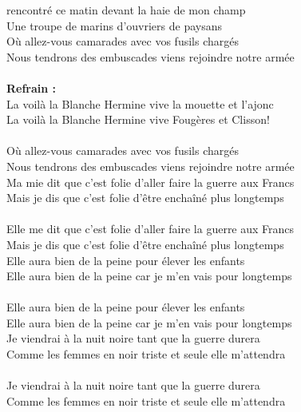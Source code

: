
 rencontré ce matin devant la haie de mon champ
\\Une troupe de marins d'ouvriers de paysans
\\Où allez-vous camarades avec vos fusils chargés
\\Nous tendrons des embuscades viens rejoindre notre armée
\\\\\textbf{Refrain :}
\\La voilà la Blanche Hermine vive la mouette et l'ajonc
\\La voilà la Blanche Hermine vive Fougères et Clisson!
\\\\Où allez-vous camarades avec vos fusils chargés
\\Nous tendrons des embuscades viens rejoindre notre armée
\\Ma mie dit que c'est folie d'aller faire la guerre aux Francs
\\Mais je dis que c'est folie d'être enchaîné plus longtemps
\\\\Elle me dit que c'est folie d'aller faire la guerre aux Francs
\\Mais je dis que c'est folie d'être enchaîné plus longtemps
\\Elle aura bien de la peine pour élever les enfants
\\Elle aura bien de la peine car je m'en vais pour longtemps
\\\\Elle aura bien de la peine pour élever les enfants
\\Elle aura bien de la peine car je m'en vais pour longtemps
\\Je viendrai à la nuit noire tant que la guerre durera
\\Comme les femmes en noir triste et seule elle m'attendra
\\\\Je viendrai à la nuit noire tant que la guerre durera
\\Comme les femmes en noir triste et seule elle m'attendra
